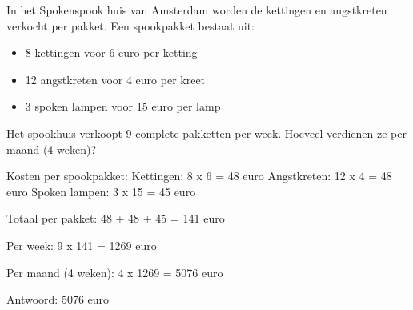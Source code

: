 \begin{opgave}
In het Spokenspook huis van Amsterdam worden de kettingen en angstkreten 
verkocht per pakket. Een spookpakket bestaat uit:
\begin{itemize}
\item 8 kettingen voor 6 euro per ketting
\item 12 angstkreten voor 4 euro per kreet
\item 3 spoken lampen voor 15 euro per lamp
\end{itemize}
Het spookhuis verkoopt 9 complete pakketten per week. Hoeveel verdienen ze 
per maand (4 weken)?
\end{opgave}

\begin{oplossing}
Kosten per spookpakket:
Kettingen: 8 x 6 = 48 euro
Angstkreten: 12 x 4 = 48 euro
Spoken lampen: 3 x 15 = 45 euro

Totaal per pakket:
48 + 48 + 45 = 141 euro

Per week: 9 x 141 = 1269 euro

Per maand (4 weken):
4 x 1269 = 5076 euro

Antwoord: 5076 euro
\end{oplossing}